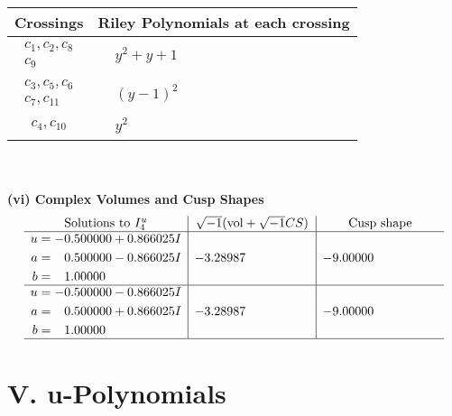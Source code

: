 \documentclass[1p]{elsarticle_modified}
\theoremstyle{definition}
\newcommand{\I}{\sqrt{-1}}
\begin{document}
\begin{tabular}{m{50pt}|m{274pt}}
Crossings & \hspace{64pt}Riley Polynomials at each crossing \\
\hline $$\begin{aligned}c_{1},c_{2},c_{8}\\c_{9}\end{aligned}$$&$\begin{aligned}
&y^2+y+1
\end{aligned}$\\
\hline $$\begin{aligned}c_{3},c_{5},c_{6}\\c_{7},c_{11}\end{aligned}$$&$\begin{aligned}
&(y-1)^2
\end{aligned}$\\
\hline $$\begin{aligned}c_{4},c_{10}\end{aligned}$$&$\begin{aligned}
&y^2
\end{aligned}$\\
\hline
\end{tabular}\\~\\
\newpage\flushleft \textbf{(vi) Complex Volumes and Cusp Shapes}
$$\begin{array}{c|c|c}  
\text{Solutions to }I^u_{4}& \I (\text{vol} + \sqrt{-1}CS) & \text{Cusp shape}\\
 \hline 
\begin{aligned}
u &= -0.500000 + 0.866025 I \\
a &= \phantom{-}0.500000 - 0.866025 I \\
b &= \phantom{-}1.00000\phantom{ +0.000000I}\end{aligned}
 & -3.28987\phantom{ +0.000000I} & -9.00000\phantom{ +0.000000I} \\ \hline\begin{aligned}
u &= -0.500000 - 0.866025 I \\
a &= \phantom{-}0.500000 + 0.866025 I \\
b &= \phantom{-}1.00000\phantom{ +0.000000I}\end{aligned}
 & -3.28987\phantom{ +0.000000I} & -9.00000\phantom{ +0.000000I}\\
 \hline 
 \end{array}$$\newpage
\newpage\renewcommand{\arraystretch}{1}
\centering \section*{ V. u-Polynomials}
\end{document}
